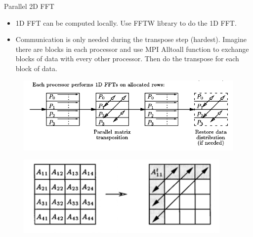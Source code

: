 \documentclass{beamer}
\begin{document}
\begin{frame}{Parallel 2D FFT}
\begin{itemize}
\item 1D FFT can be computed locally. Use FFTW library to do the 1D FFT.
\item Communication is only needed during the transpose step (hardest).
Imagine there are blocks in each processor and use MPI Alltoall 	function to exchange blocks of data with every other processor. Then do the transpose for each block of data.
\end{itemize}
\begin{figure}
\includegraphics[width=\linewidth]{fft2.png}
\end{figure}
\vspace{-1cm}
\begin{figure}
\includegraphics[width=0.6\linewidth]{transpose.png}
\end{figure}
\end{frame}
\end{document}
